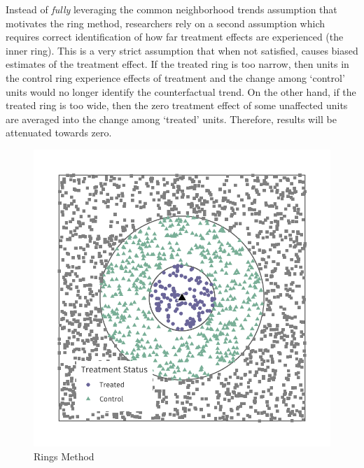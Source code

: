Instead of \textit{fully} leveraging the common neighborhood trends assumption that motivates the ring method, researchers rely on a second assumption which requires correct identification of how far treatment effects are experienced (the inner ring). This is a very strict assumption that when not satisfied, causes biased estimates of the treatment effect. If the treated ring is too narrow, then units in the control ring experience effects of treatment and the change among `control' units would no longer identify the counterfactual trend. On the other hand, if the treated ring is too wide, then the zero treatment effect of some unaffected units are averaged into the change among `treated' units. Therefore, results will be attenuated towards zero.


\begin{figure}[tb]
  \caption{Rings Method}
  \label{fig:example-id}

  \begin{adjustbox}{width = 0.4\textwidth, center}
      \includegraphics[width=\textwidth]{figures/geocoded/example_id.pdf}
  \end{adjustbox}

\end{figure}

